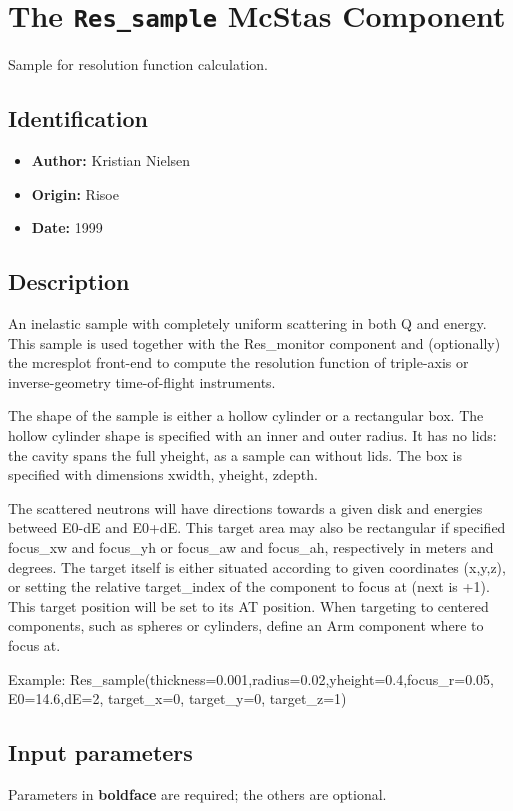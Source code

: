 \section{The \texttt{Res\_sample} McStas Component}
Sample for resolution function calculation.

\subsection*{Identification}
\begin{itemize}
  \item \textbf{Author:} Kristian Nielsen
  \item \textbf{Origin:} Risoe
  \item \textbf{Date:} 1999
\end{itemize}

\subsection*{Description}
An inelastic sample with completely uniform scattering in both Q and energy. This sample is used together with the Res\_monitor component and (optionally) the mcresplot front-end to compute the resolution function of triple-axis or inverse-geometry time-of-flight instruments.

The shape of the sample is either a hollow cylinder or a rectangular box. The hollow cylinder shape is specified with an inner and outer radius. It has no lids: the cavity spans the full yheight, as a sample can without lids. The box is specified with dimensions xwidth, yheight, zdepth.

The scattered neutrons will have directions towards a given disk and energies betweed E0-dE and E0+dE. This target area may also be rectangular if specified focus\_xw and focus\_yh or focus\_aw and focus\_ah, respectively in meters and degrees. The target itself is either situated according to given coordinates (x,y,z), or setting the relative target\_index of the component to focus at (next is +1). This target position will be set to its AT position. When targeting to centered components, such as spheres or cylinders, define an Arm component where to focus at.

Example: Res\_sample(thickness=0.001,radius=0.02,yheight=0.4,focus\_r=0.05, E0=14.6,dE=2, target\_x=0, target\_y=0, target\_z=1)

\subsection*{Input parameters}
Parameters in \textbf{boldface} are required; the others are optional.

